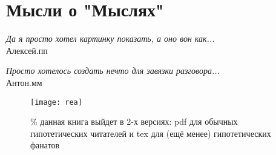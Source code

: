 \section*{Мысли о "Мыслях"}

\begin{flushright}
\emph{Да я просто хотел картинку показать, а оно вон как...}\\
    Алексей.пп %
\end{flushright}


\begin{flushright}
\emph{Просто хотелось создать нечто для завязки разговора...}\\
Антон.мм %
\end{flushright}

\begin{figure}[ht!]
    \centering
    \texttt{[image: rea]}
    \caption{\% данная книга выйдет в 2-х версиях: pdf для обычных гипотетических читателей и tex для (ещё менее) гипотетических фанатов}
\end{figure}

